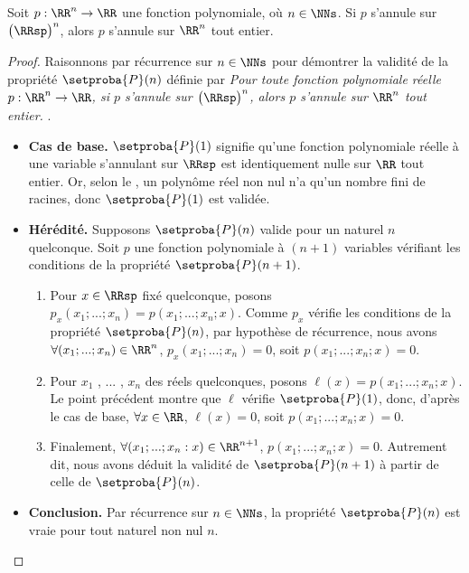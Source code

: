 

\begin{fact} \label{poly-nullity-pos}
	Soit $p: \RR^n \rightarrow \RR$ une fonction polynomiale, où $n \in \NNs$.
	Si $p$ s'annule sur $\big( \RRsp \big)^n$, alors $p$ s'annule sur $\RR^n$ tout entier. 
\end{fact}


\begin{proof}
	Raisonnons par récurrence sur $n \in \NNs$ pour démontrer la validité de la propriété $\setproba{P}(n)$ définie par
	\emph{\og 
		Pour toute fonction polynomiale réelle $p: \RR^n \rightarrow \RR$,
		si $p$ s'annule sur $\big( \RRsp \big)^n$,
		alors $p$ s'annule sur $\RR^n$ tout entier. 
	\fg}\kern2pt.
	\begin{itemize}[label=\small\textbullet]
		\item \textbf{Cas de base.}
		$\setproba{P}(1)$ signifie qu'une fonction polynomiale réelle à une variable s'annulant sur $\RRsp$ est identiquement nulle sur $\RR$ tout entier.
		Or, selon le , un polynôme réel non nul n'a qu'un nombre fini de racines, donc $\setproba{P}(1)$ est validée.


		\item \textbf{Hérédité.}
		Supposons $\setproba{P}(n)$ valide pour un naturel $n$ quelconque.
		Soit $p$ une fonction polynomiale à $(n + 1)$ variables vérifiant les conditions de la propriété $\setproba{P}(n + 1)$.
		\begin{enumerate}
		    \item Pour $x \in \RRsp$ fixé quelconque,
		    posons $p_x(x_1 ; ... ; x_n) = p(x_1 ; ... ; x_n ; x)$.
		    Comme $p_x$ vérifie les conditions de la propriété $\setproba{P}(n)$, par hypothèse de récurrence, nous avons
		    $\forall (x_1 ; ... ; x_n) \in \RR^n$,
		    $p_x(x_1 ; ... ; x_n) = 0$,
		    soit $p(x_1 ; ... ; x_n ; x) = 0$.


		    \item Pour $x_1$ , ... , $x_n$ des réels quelconques,
		    posons $\ell(x) = p(x_1 ; ... ; x_n ; x)$.
		    Le point précédent montre que $\ell$ vérifie $\setproba{P}(1)$, donc, d'après le cas de base,
		    $\forall x \in \RR$,
		    $\ell(x) = 0$,
		    soit $p(x_1 ; ... ; x_n ; x) = 0$.


		    \item Finalement,
		    $\forall (x_1 ; ... ; x_n : x) \in \RR^{n+1}$,
		    $p(x_1 ; ... ; x_n ; x) = 0$.
		    Autrement dit, nous avons déduit la validité de $\setproba{P}(n+1)$ à partir de celle de $\setproba{P}(n)$.
		\end{enumerate}
		
		
		\item \textbf{Conclusion.}
		Par récurrence sur $n \in \NNs$, la propriété $\setproba{P}(n)$ est vraie pour tout naturel non nul $n$.
	\end{itemize}

	\null\vspace{-6ex}
\end{proof}


